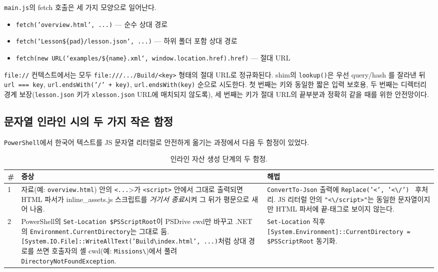 \documentclass[11pt, oneside]{article}
\begin{document}
\texttt{main.js}의 fetch 호출은 세 가지 모양으로 일어난다.

\begin{itemize}
  \item \texttt{fetch('overview.html', ...)} --- 순수 상대 경로
  \item \texttt{fetch(`Lesson\$\{pad\}/lesson.json`, ...)} --- 하위 폴더 포함 상대 경로
  \item \texttt{fetch(new URL(`examples/\$\{name\}.xml`, window.location.href).href)} --- 절대 URL
\end{itemize}

\texttt{file://} 컨텍스트에서는 모두 \texttt{file:///.../Build/<key>} 형태의
절대 URL로 정규화된다. shim의 \texttt{lookup()}은 우선 query/hash 를
잘라낸 뒤 \texttt{url === key}, \texttt{url.endsWith('/' + key)},
\texttt{url.endsWith(key)} 순으로 시도한다. 첫 번째는 키와 동일한 짧은
입력 보호용, 두 번째는 디렉터리 경계 보장(\texttt{lesson.json} 키가
\texttt{xlesson.json} URL에 매치되지 않도록), 세 번째는 키가 절대 URL의
끝부분과 정확히 같을 때를 위한 안전망이다.

\subsection{문자열 인라인 시의 두 가지 작은 함정}

\texttt{PowerShell}에서 한국어 텍스트를 JS 문자열 리터럴로 안전하게 옮기는
과정에서 다음 두 함정이 있었다.

\begin{table}[h]
\centering
\small
\begin{tabularx}{\linewidth}{@{}lXX@{}}
\toprule
\# & 증상 & 해법 \\
\midrule
1 & 자료(예: \texttt{overview.html}) 안의 \texttt{<\/...}{}>가 \texttt{<script>} 안에서 그대로 출력되면 HTML 파서가 inline\_assets.js 스크립트를 \emph{거기서 종료}시켜 그 뒤가 평문으로 새어 나옴. & \texttt{ConvertTo-Json} 출력에 \texttt{Replace('<\/', '<\textbackslash{}/') } 후처리. JS 리터럴 안의 \texttt{"<\textbackslash{}/script>"}는 동일한 문자열이지만 HTML 파서에 끝-태그로 보이지 않는다. \\
\midrule
2 & PowerShell의 \texttt{Set-Location \$PSScriptRoot}이 PSDrive cwd만 바꾸고 .NET 의 \texttt{Environment.CurrentDirectory}는 그대로 둠. \texttt{[System.IO.File]::WriteAllText('Build\textbackslash{}index.html', ...)}처럼 상대 경로를 쓰면 호출자의 셸 cwd(예: \texttt{Missions\textbackslash{}})에서 풀려 \texttt{DirectoryNotFoundException}. & \texttt{Set-Location} 직후 \texttt{[System.Environment]::CurrentDirectory = \$PSScriptRoot} 동기화. \\
\bottomrule
\end{tabularx}
\caption{인라인 자산 생성 단계의 두 함정.}
\end{table}
\end{document}
